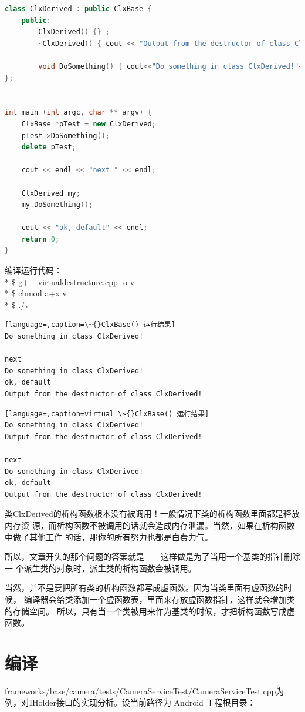 \documentclass[a4paper,11pt]{article}
\begin{document}
\begin{appendices}
\begin{lstlisting}[language=c++, caption=virtualdestructure.cpp]
class ClxDerived : public ClxBase {
    public:
        ClxDerived() {} ;
        ~ClxDerived() { cout << "Output from the destructor of class ClxDerived!" << endl; } ;

        void DoSomething() { cout<<"Do something in class ClxDerived!"<<endl;};
};


int main (int argc, char ** argv) {
    ClxBase *pTest = new ClxDerived;
    pTest->DoSomething();
    delete pTest;

    cout << endl << "next " << endl;

    ClxDerived my;
    my.DoSomething(); 

    cout << "ok, default" << endl;
    return 0;
}
\end{lstlisting}

编译运行代码：\\*
\$ g++ virtualdestructure.cpp -o v\\*
\$ chmod a+x v\\*
\$ ./v

\begin{lstlisting}[language=,caption=\~{}ClxBase() 运行结果]
Do something in class ClxDerived!

next 
Do something in class ClxDerived!
ok, default
Output from the destructor of class ClxDerived!
\end{lstlisting}

\begin{lstlisting}[language=,caption=virtual \~{}ClxBase() 运行结果]
Do something in class ClxDerived!
Output from the destructor of class ClxDerived!

next 
Do something in class ClxDerived!
ok, default
Output from the destructor of class ClxDerived!
\end{lstlisting}

类ClxDerived的析构函数根本没有被调用！一般情况下类的析构函数里面都是释放内存资
源，而析构函数不被调用的话就会造成内存泄漏。当然，如果在析构函数中做了其他工作
的话，那你的所有努力也都是白费力气。

所以，文章开头的那个问题的答案就是－－这样做是为了当用一个基类的指针删除一
个派生类的对象时，派生类的析构函数会被调用。

当然，并不是要把所有类的析构函数都写成虚函数。因为当类里面有虚函数的时候，
编译器会给类添加一个虚函数表，里面来存放虚函数指针，这样就会增加类的存储空间。
所以，只有当一个类被用来作为基类的时候，才把析构函数写成虚函数。

    \section{编译}\label{compile}
    frameworks/base/camera/tests/CameraServiceTest/CameraServiceTest.cpp为例，对IHolder接口的实现分析。设当前路径为 Android 工程根目录：


\end{appendices}
\end{document}
